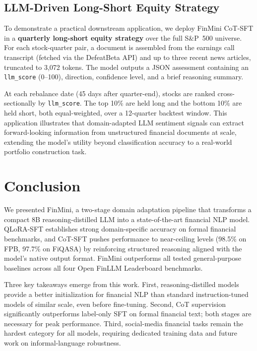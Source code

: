 \documentclass[11pt,letterpaper]{article}
\begin{document}
\subsection{LLM-Driven Long-Short Equity Strategy}

To demonstrate a practical downstream application, we deploy FinMini
CoT-SFT in a \textbf{quarterly long-short equity strategy} over the
full S\&P~500 universe.
For each stock-quarter pair, a document is assembled from the earnings
call transcript (fetched via the DefeatBeta API) and up to three recent
news articles, truncated to 3,072 tokens.
The model outputs a JSON assessment containing an \texttt{llm\_score}
(0--100), direction, confidence level, and a brief reasoning summary.

At each rebalance date (45 days after quarter-end), stocks are ranked
cross-sectionally by \texttt{llm\_score}.
The top 10\% are held long and the bottom 10\% are held short, both
equal-weighted, over a 12-quarter backtest window.
This application illustrates that domain-adapted LLM sentiment signals
can extract forward-looking information from unstructured financial
documents at scale, extending the model's utility beyond classification
accuracy to a real-world portfolio construction task.

\section{Conclusion}
\label{sec:conclusion}

We presented FinMini, a two-stage domain adaptation pipeline that
transforms a compact 8B reasoning-distilled LLM into a
state-of-the-art financial NLP model.
QLoRA-SFT establishes strong domain-specific accuracy on formal
financial benchmarks, and CoT-SFT pushes performance to near-ceiling
levels (98.5\% on FPB, 97.7\% on FiQASA) by reinforcing structured
reasoning aligned with the model's native output format.
FinMini outperforms all tested general-purpose baselines across all four
Open FinLLM Leaderboard benchmarks.

Three key takeaways emerge from this work.
First, reasoning-distilled models provide a better initialization for
financial NLP than standard instruction-tuned models of similar scale,
even before fine-tuning.
Second, CoT supervision significantly outperforms label-only SFT on
formal financial text; both stages are necessary for peak performance.
Third, social-media financial tasks remain the hardest category for
all models, requiring dedicated training data and future work on
informal-language robustness.
\end{document}
